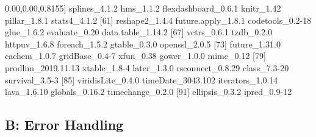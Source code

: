 \documentclass[
]{article}
\newenvironment{Shaded}{\begin{snugshade}}{\end{snugshade}}
\newcommand{\DecValTok}[1]{\textcolor[rgb]{0.00,0.00,0.81}{#1}}
\newcommand{\FloatTok}[1]{\textcolor[rgb]{0.00,0.00,0.81}{#1}}
\newcommand{\NormalTok}[1]{#1}
\begin{document}
\begin{Shaded}
\begin{Highlighting}[]
\NormalTok{[}\DecValTok{55}\NormalTok{] splines\_4.}\FloatTok{1.2}\NormalTok{        hms\_1.}\FloatTok{1.2}\NormalTok{            flexdashboard\_0.}\FloatTok{6.1}\NormalTok{  knitr\_1}\FloatTok{.42}\NormalTok{           pillar\_1.}\FloatTok{8.1}\NormalTok{         stats4\_4.}\FloatTok{1.2}        
\NormalTok{[}\DecValTok{61}\NormalTok{] reshape2\_1.}\FloatTok{4.4}\NormalTok{       future.apply\_1.}\FloatTok{8.1}\NormalTok{   codetools\_0}\FloatTok{.2}\DecValTok{{-}18}\NormalTok{     glue\_1.}\FloatTok{6.2}\NormalTok{           evaluate\_0}\FloatTok{.20}\NormalTok{        data.table\_1.}\FloatTok{14.2}   
\NormalTok{[}\DecValTok{67}\NormalTok{] vctrs\_0.}\FloatTok{6.1}\NormalTok{          tzdb\_0.}\FloatTok{2.0}\NormalTok{           httpuv\_1.}\FloatTok{6.8}\NormalTok{         foreach\_1.}\FloatTok{5.2}\NormalTok{        gtable\_0.}\FloatTok{3.0}\NormalTok{         openssl\_2.}\FloatTok{0.5}       
\NormalTok{[}\DecValTok{73}\NormalTok{] future\_1.}\FloatTok{31.0}\NormalTok{        cachem\_1.}\FloatTok{0.7}\NormalTok{         gridBase\_0}\FloatTok{.4}\DecValTok{{-}7}\NormalTok{       xfun\_0}\FloatTok{.38}\NormalTok{            gower\_1.}\FloatTok{0.0}\NormalTok{          mime\_0}\FloatTok{.12}           
\NormalTok{[}\DecValTok{79}\NormalTok{] prodlim\_2019.}\FloatTok{11.13}\NormalTok{   xtable\_1}\FloatTok{.8}\DecValTok{{-}4}\NormalTok{         later\_1.}\FloatTok{3.0}\NormalTok{          rsconnect\_0.}\FloatTok{8.29}\NormalTok{     class\_7}\FloatTok{.3}\DecValTok{{-}20}\NormalTok{         survival\_3}\FloatTok{.5}\DecValTok{{-}3}      
\NormalTok{[}\DecValTok{85}\NormalTok{] viridisLite\_0.}\FloatTok{4.0}\NormalTok{    timeDate\_3043}\FloatTok{.102}\NormalTok{    iterators\_1.}\FloatTok{0.14}\NormalTok{     lava\_1.}\FloatTok{6.10}\NormalTok{          globals\_0.}\FloatTok{16.2}\NormalTok{       timechange\_0.}\FloatTok{2.0}    
\NormalTok{[}\DecValTok{91}\NormalTok{] ellipsis\_0.}\FloatTok{3.2}\NormalTok{       ipred\_0}\FloatTok{.9}\DecValTok{{-}12}  
\end{Highlighting}
\end{Shaded}

\normalsize
\newpage

\hypertarget{b-error-handling}{%
\subsection{\texorpdfstring{B: Error Handling\\
}{B: Error Handling }}\label{b-error-handling}}
\end{document}

